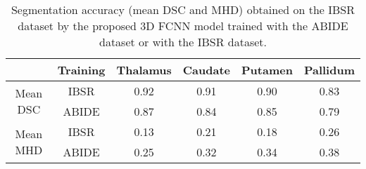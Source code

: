 \documentclass[twoside,fleqn,espcrc2]{elsarticle}
\begin{document}
\begin{comment}
\begin{table}[ht!]
\begin{footnotesize}
\centering
\renewcommand{\arraystretch}{1.2}
\begin{tabular}{ccccc}
\toprule
\multicolumn{5}{c}{Mean DSC} \\
\midrule
        \textbf{Training dataset} & \textbf{Thalamus} & \textbf{Caudate} & \textbf{Putamen} & \textbf{Pallidum} \\ \hline
IBSR   &  0.92 ($\pm$ 0.02) & 0.91 ($\pm$ 0.06) & 0.90 ($\pm$ 0.04) & 0.83 ($\pm$ 0.05)\\
ABIDE  &  0.87 ($\pm$ 0.05) & 0.84 ($\pm$ 0.05) & 0.85 ($\pm$ 0.05) & 0.79 ($\pm$ 0.06)\\
\bottomrule
& & & & \\
\toprule
\multicolumn{5}{c}{Mean MHD (mm)} \\
\midrule
\textbf{Training} & \textbf{Thalamus} & \textbf{Caudate} & \textbf{Putamen} & \textbf{Pallidum} \\
\midrule
IBSR  & 0.13 ($\pm$ 0.05) & 0.21 ($\pm$ 0.20) & 0.18 ($\pm$ 0.16) & 0.26 ($\pm$ 0.12)\\
ABIDE & 0.25 ($\pm$ 0.13) & 0.32 ($\pm$ 0.16) & 0.34 ($\pm$ 0.14) & 0.38 ($\pm$ 0.17)\\
\bottomrule
\end{tabular}
\caption{Segmentation accuracy (mean DSC and MHD) obtained on the IBSR dataset by the proposed 3D FCNN model trained with the ABIDE dataset or with the IBSR dataset.}
\label{table_IBSR_ABIDE}
\end{footnotesize}
\end{table}
\end{comment}

\begin{table}[ht!]
\begin{footnotesize}
\centering
\renewcommand{\arraystretch}{1.2}
\begin{tabular}{cccccc}
\toprule
 & \textbf{Training} & \textbf{Thalamus} & \textbf{Caudate} & \textbf{Putamen} & \textbf{Pallidum} \\ \hline
\multirow{2}{*}{Mean DSC} & IBSR &  0.92  & 0.91 & 0.90 &  0.83\\
& ABIDE  &  0.87  &   0.84    &  0.85   &   0.79 \\
\midrule
\multirow{2}{*}{Mean MHD}  & IBSR  & 0.13  &  0.21  & 0.18  & 0.26 \\
& ABIDE  &  0.25  & 0.32  & 0.34  &  0.38 \\
\bottomrule
\end{tabular}
\caption{Segmentation accuracy (mean DSC and MHD) obtained on the IBSR dataset by the proposed 3D FCNN model trained with the ABIDE dataset or with the IBSR dataset.}
\label{table_IBSR_ABIDE}
\end{footnotesize}
\end{table}
\end{document}
